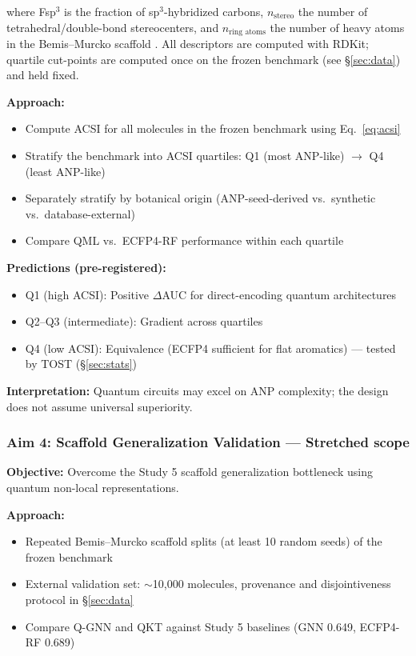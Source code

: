 \documentclass[11pt,a4paper]{article}
\begin{document}
where Fsp$^3$ is the fraction of sp$^3$-hybridized carbons, $n_{\text{stereo}}$ the number of tetrahedral/double-bond stereocenters, and $n_{\text{ring atoms}}$ the number of heavy atoms in the Bemis--Murcko scaffold \cite{bemis1996,lovering2009}. All descriptors are computed with RDKit; quartile cut-points are computed once on the frozen benchmark (see \S\ref{sec:data}) and held fixed.

\textbf{Approach:}
\begin{itemize}
    \item Compute ACSI for all molecules in the frozen benchmark using Eq.\ \ref{eq:acsi}
    \item Stratify the benchmark into ACSI quartiles: Q1 (most ANP-like) $\rightarrow$ Q4 (least ANP-like)
    \item Separately stratify by botanical origin (ANP-seed-derived vs.\ synthetic vs.\ database-external)
    \item Compare QML vs.\ ECFP4-RF performance within each quartile
\end{itemize}

\textbf{Predictions (pre-registered):}
\begin{itemize}
    \item Q1 (high ACSI): Positive $\Delta$AUC for direct-encoding quantum architectures
    \item Q2--Q3 (intermediate): Gradient across quartiles
    \item Q4 (low ACSI): Equivalence (ECFP4 sufficient for flat aromatics) --- tested by TOST (\S\ref{sec:stats})
\end{itemize}

\textbf{Interpretation:} Quantum circuits may excel on ANP complexity; the design does not assume universal superiority.

\subsubsection{Aim 4: Scaffold Generalization Validation --- Stretched scope}

\textbf{Objective:} Overcome the Study 5 scaffold generalization bottleneck using quantum non-local representations.

\textbf{Approach:}
\begin{itemize}
    \item Repeated Bemis--Murcko scaffold splits (at least 10 random seeds) of the frozen benchmark
    \item External validation set: $\sim$10,000 molecules, provenance and disjointiveness protocol in \S\ref{sec:data}
    \item Compare Q-GNN and QKT against Study 5 baselines (GNN 0.649, ECFP4-RF 0.689)
\end{itemize}
\end{document}
